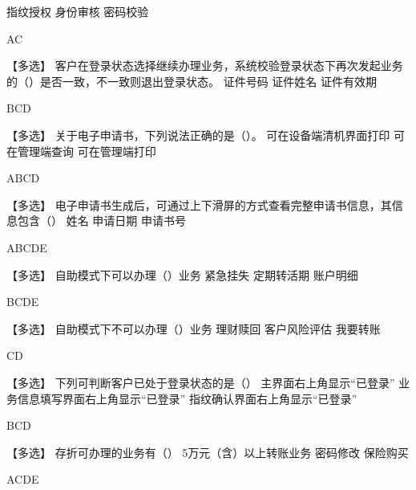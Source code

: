 \documentclass[kindlepaper]{BHCexam4kindle}
\begin{document}
\begin{questions}
 {  指纹授权 } { 身份审核 } { 密码校验 }
\begin{solution} AC \end{solution}
\qs 【多选】 客户在登录状态选择继续办理业务，系统校验登录状态下再次发起业务的（）是否一致，不一致则退出登录状态。 \xx
{} {  证件号码 } { 证件姓名 } { 证件有效期 }
\begin{solution} BCD \end{solution}
\qs 【多选】 关于电子申请书，下列说法正确的是（）。 \xx
{} {  可在设备端清机界面打印 } { 可在管理端查询 } { 可在管理端打印 }
\begin{solution} ABCD \end{solution}
\qs 【多选】 电子申请书生成后，可通过上下滑屏的方式查看完整申请书信息，其信息包含（） \xx
{} {  姓名 } { 申请日期 } { 申请书号 }
\begin{solution} ABCDE \end{solution}
\qs 【多选】 自助模式下可以办理（）业务 \xx
{} {  紧急挂失 } { 定期转活期 } { 账户明细 }
\begin{solution} BCDE \end{solution}
\qs 【多选】 自助模式下不可以办理（）业务 \xx
{} {  理财赎回 } { 客户风险评估 } { 我要转账 }
\begin{solution} CD \end{solution}
\qs 【多选】 下列可判断客户已处于登录状态的是（） \xx
{} {  主界面右上角显示“已登录” } { 业务信息填写界面右上角显示“已登录” } { 指纹确认界面右上角显示“已登录” }
\begin{solution} BCD \end{solution}
\qs 【多选】 存折可办理的业务有（） \xx
{} {  5万元（含）以上转账业务 } { 密码修改 } { 保险购买 }
\begin{solution} ACDE \end{solution}

\end{questions}
\end{document}
